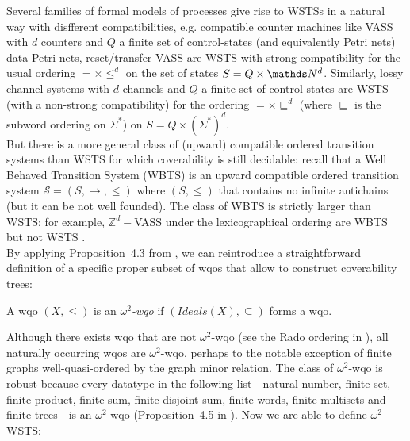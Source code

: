 \documentclass[runningheads]{llncs}
\begin{document}
Several families of formal models of processes  \cite{DBLP:journals/tcs/FinkelS01} give rise to WSTSs in a natural way with disfferent compatibilities, e.g. compatible counter machines like VASS with $d$ counters and $Q$ a finite set of control-states (and equivalently Petri nets) data Petri nets\nocite{DBLP:journals/fuin/LazicNORW08}, reset/transfer VASS are WSTS with strong compatibility for the usual ordering $=\times \leq^d$ on the set of states $S=Q \times \N^d$.
Similarly, lossy channel systems with $d$ channels and $Q$ a finite set of control-states are WSTS (with a non-strong compatibility)
for the ordering $=\times \sqsubseteq^d$ (where $\sqsubseteq$ is the subword ordering on $\Sigma^*$) on $S= Q \times (\Sigma^*)^d$.\\

But there is a more general class of (upward) compatible ordered transition systems than WSTS for which coverability is still decidable: recall that a Well Behaved Transition System (WBTS) \cite{DBLP:journals/lmcs/BlondinFM17} is an upward compatible ordered transition system $\mathscr{S}=(S, \rightarrow, \leq)$ where $(S,\leq)$ that contains no infinite antichains (but it can be not well founded). The class of WBTS is strictly larger than WSTS: for example, $\mathbb{Z}^d-$VASS under the lexicographical ordering are WBTS but not WSTS \cite{DBLP:journals/lmcs/BlondinFM17}. \\

By applying Proposition~4.3 from \cite{DBLP:journals/corr/abs-1208-4549}, we can reintroduce a straightforward definition of a specific proper subset of wqos that allow to construct coverability trees: 

\begin{definition}
A wqo $(X, \leq)$ is an \emph{$\omega^2$-wqo} if $(Ideals(X), \subseteq)$ forms a wqo.
\end{definition}


Although there exists wqo that are not $\omega^2$-wqo (see the Rado ordering in \cite{DBLP:journals/ipl/Jancar99}), all naturally occurring wqos are $\omega^2$-wqo, perhaps to the notable exception of ﬁnite graphs well-quasi-ordered by the graph minor relation. %
The class of $\omega^2$-wqo is robust because every datatype in the following list - natural number, finite set, ﬁnite product, ﬁnite sum, finite disjoint sum, ﬁnite words, ﬁnite multisets and ﬁnite trees - is an $\omega^2$-wqo (Proposition~4.5 in \cite{DBLP:journals/corr/abs-1208-4549}). Now we are able to define $\omega^2$-WSTS:
\end{document}
